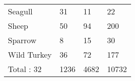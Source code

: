 \begin{table}[t]
\begin{tabular}{|l|l|l|l|}
Seagull               & 31                             & 11                             & 22                             \\
Sheep                 & 50                             & 94                             & 200                            \\
Sparrow               & 8                              & 15                             & 30                             \\
Wild Turkey           & 36                             & 72                             & 177                            \\ \hline
Total \spec{}: 32     & 1236                           & 4682                           & 10732                          \\ \hline
\end{tabular}
\end{table}